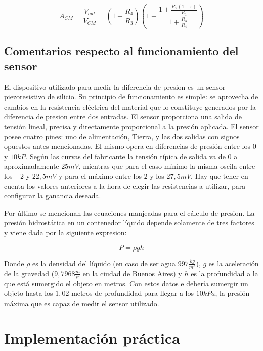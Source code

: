 \documentclass[a4paper]{article}
\begin{document}
\begin{equation}
A_{CM} = \frac{V_{out}}{V_{CM}} = (1 + \frac{R_4}{R_3})(1 - \frac{1 + \frac{R_2(1 - \epsilon)}{R_1}}{1 + \frac{R_3}{R_4}})
\end{equation}

\subsection{Comentarios respecto al funcionamiento del sensor}

El dispositivo utilizado para medir la diferencia de presion es un sensor piezoresistivo de silicio. Su principio de funcionamiento es simple: se aprovecha de cambios en la resistencia eléctrica del material que lo constituye generados por la diferencia de presion entre dos entradas. El sensor proporciona una salida de tensión lineal, precisa y directamente proporcional a la presión aplicada. El sensor posee cuatro pines: uno de alimentación, Tierra, y las dos salidas con signos opuestos antes mencionadas. El mismo opera en diferencias de presión entre los $0$ y $10kP$. Según las curvas del fabricante la tensión típica de salida va de $0$ a aproximadamente $25mV$, mientras que para el caso mínimo la misma oscila entre los $-2$ y $22,5mV$ y para el máximo entre los $2$ y los $27,5mV$. Hay que tener en cuenta los valores anteriores a la hora de elegir las resistencias a utilizar, para configurar la ganancia deseada. 

Por último se mencionan las ecuaciones manjeadas para el cálculo de presion. La presión hidrostática en un contenedor líquido depende solamente de tres factores y viene dada por la siguiente expresion:

\begin{equation}
P = \rho gh
\end{equation}

Donde $\rho$ es la densidad del líquido (en caso de ser agua $997\frac{kg}{m^3}$), $g$ es la aceleración de la gravedad ($9,7968\frac{m}{s^2}$ en la ciudad de Buenos Aires) y $h$ es la profundidad a la que está sumergido el objeto en metros. Con estos datos e debería sumergir un objeto hasta los $1,02$ metros de profundidad para llegar a los $10kPa$, la presión máxima que es capaz de medir el sensor utilizado. 


\section{Implementación práctica}
\end{document}
